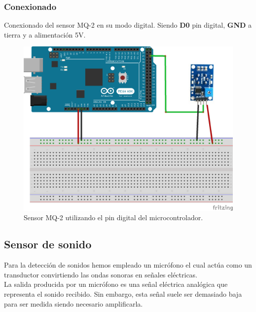 \subsubsection{Conexionado}

Conexionado del sensor MQ-2 en su modo digital. Siendo \textbf{D0} pin digital, \textbf{GND} a tierra y  a alimentación 5V.\\

\begin{figure}[H]
  \begin{center}
    \includegraphics[scale=0.6]{imagenes/mq_2_conexionado.png}
  \end{center}
  \caption{Sensor MQ-2 utilizando el pin digital del microcontrolador.}
  \label{figura:mq_2_conexionado}
\end{figure}


\subsection{ Sensor de sonido }

Para la detección de sonidos hemos empleado un micrófono el cual actúa como un transductor convirtiendo las ondas sonoras en señales eléctricas.\\

La salida producida por un micrófono es una señal eléctrica analógica que representa el sonido recibido. Sin embargo, esta señal suele ser demasiado baja para ser medida
siendo necesario amplificarla.\\

